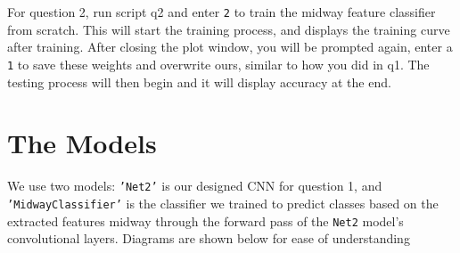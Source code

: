 \documentclass[]{report}
\begin{document}
For question 2, run script q2 and enter \texttt{2} to train the midway feature classifier from scratch. This will start the training process, and displays the training curve after training. After closing the plot window, you will be prompted again, enter a \texttt{1} to save these weights and overwrite ours, similar to how you did in q1. The testing process will then begin and it will display accuracy at the end.

\section*{The Models}

We use two models: \texttt{'Net2'} is our designed CNN for question 1, and \texttt{'MidwayClassifier'} is the classifier we trained to predict classes based on the extracted features midway through the forward pass of the \texttt{Net2} model's convolutional layers. Diagrams are shown below for ease of understanding
\end{document}
